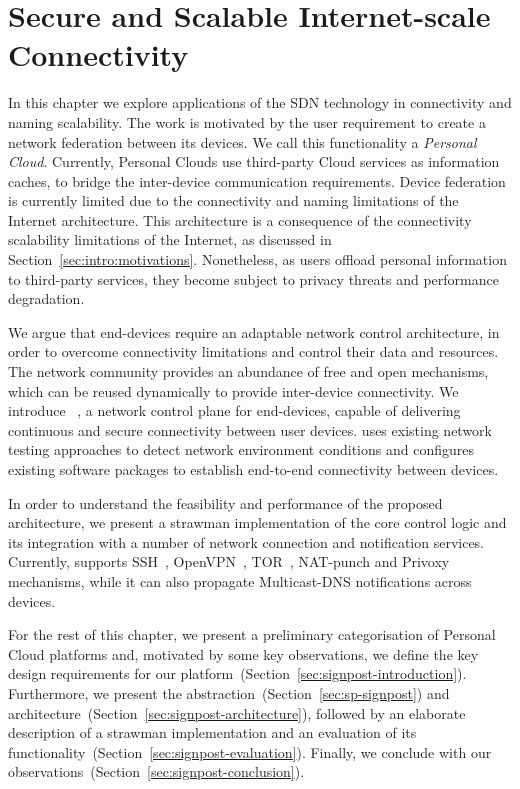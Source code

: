 \chapter{Secure and Scalable Internet-scale Connectivity}
\label{sec:signpost}

In this chapter we explore applications of the SDN technology in connectivity and
naming scalability.  The work is motivated by the user requirement to create a
network federation between its devices.  We call this functionality a
\emph{Personal Cloud}.  Currently, Personal Clouds use third-party Cloud
services as information caches, to bridge the inter-device communication
requirements. Device federation is currently limited due to the connectivity and
naming limitations of the Internet architecture.  This architecture is a
consequence of the connectivity scalability limitations of the Internet, as
discussed in Section~\ref{sec:intro:motivations}. Nonetheless, as users offload
personal information to third-party services, they become subject to privacy
threats and performance degradation.

We argue that end-devices require an adaptable network control architecture, in
order to overcome  connectivity limitations and control their data and
resources.  The network community provides an abundance of free and open
mechanisms, which can be reused dynamically to provide inter-device
connectivity.  We introduce \signpost~\cite{Rotsos14}, a network control plane for end-devices,
capable of delivering continuous and secure connectivity between user devices.
\signpost uses existing network testing approaches to detect network
environment conditions and configures existing software packages to establish
end-to-end connectivity between devices. 

In order to understand the feasibility and performance of the proposed
architecture, we present a strawman implementation of the core control logic and
its integration with a number of network connection and notification services.
Currently, \signpost supports SSH~, OpenVPN~,
TOR~, NAT-punch and Privoxy~ 
mechanisms, while it can also propagate Multicast-DNS notifications across
devices.

For the rest of this chapter, we present a preliminary categorisation of
Personal Cloud platforms and, motivated by some key observations, we define the
key design requirements for our
platform~(Section~\ref{sec:signpost-introduction}). Furthermore, we present the
\signpost abstraction~(Section~\ref{sec:sp-signpost}) and
architecture~(Section~\ref{sec:signpost-architecture}), followed by an elaborate
description of a strawman \signpost implementation and an evaluation of its
functionality~(Section~\ref{sec:signpost-evaluation}).  Finally, we conclude with our
observations~(Section~\ref{sec:signpost-conclusion}).

